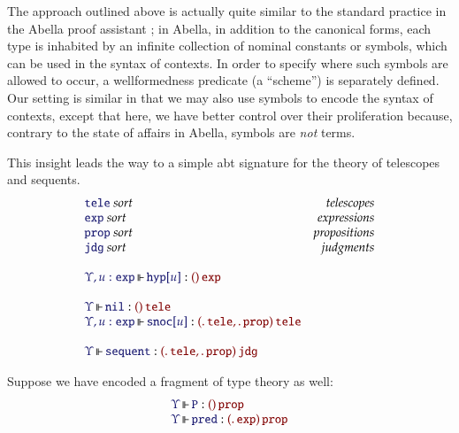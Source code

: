 \documentclass[11pt]{article}
\theoremstyle{definition}
\theoremstyle{remark}
\numberwithin{equation}{section}
\newcommand\SortExp{\mathtt{exp}}
\begin{document}
The approach outlined above is actually quite similar to the standard practice
in the Abella proof assistant \cite{gacek:2008}; in Abella, in addition to the
canonical forms, each type is inhabited by an infinite collection of nominal
constants or symbols, which can be used in the syntax of contexts. In order to
specify where such symbols are allowed to occur, a wellformedness predicate (a
``scheme'') is separately defined. Our setting is similar in that we may also
use symbols to encode the syntax of contexts, except that here, we have better
control over their proliferation because, contrary to the state of
affairs in Abella, symbols are \emph{not} terms.

This insight leads the way to a simple abt signature for the theory of
telescopes and sequents.
%
\newcommand\SortTele{\mathtt{tele}}
\newcommand\SortJdg{\mathtt{jdg}}
\newcommand\SortProp{\mathtt{prop}}
\newcommand\SortExpr{\mathtt{exp}}
\newcommand\OpNil{\mathtt{nil}}
\newcommand\OpSnoc[1]{\mathtt{snoc}[#1]}
\newcommand\OpHyp[1]{\mathtt{hyp}[#1]}
\newcommand\OpSequent{\mathtt{sequent}}
\[
  \begin{array}{lr}
    \IsSort{\SortTele}&\textit{telescopes}\\
    \IsSort{\SortExpr}&\textit{expressions}\\
    \IsSort{\SortProp}&\textit{propositions}\\
    \IsSort{\SortJdg}&\textit{judgments}\\\\
    \IsOperator{\Upsilon, u:\SortExpr}{\OpHyp{u}}{
      \MkArity{}{\SortExpr}
    }\\\\
    \IsOperator{\Upsilon}{\OpNil}{
      \MkArity{}{\SortTele}
    }\\
    \IsOperator{\Upsilon, u:\SortExpr}{\OpSnoc{u}}{
      \MkArity{
        \MkValence{}{}{\SortTele},
        \MkValence{}{}{\SortProp}
      }{\SortTele}
    }\\\\
    \IsOperator{\Upsilon}{\OpSequent}{
      \MkArity{
        \MkValence{}{}{\SortTele},
        \MkValence{}{}{\SortProp}
      }{\SortJdg}
    }
  \end{array}
\]

Suppose we have encoded a fragment of type theory as well:
\[
  \begin{array}{l}
    \IsOperator{\Upsilon}{\mathtt{P}}{
      \MkArity{}{\SortProp}
    }
\\
    \IsOperator{\Upsilon}{\mathtt{pred}}{
      \MkArity{
        \MkValence{}{}{\SortExp}
      }{\SortProp}
    }
\\
  \end{array}
\]
\end{document}
